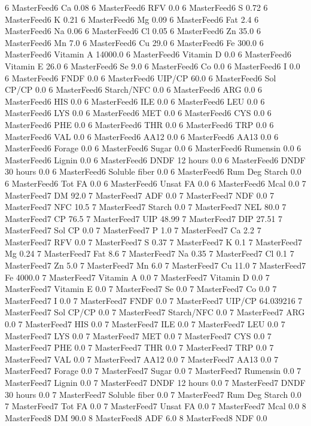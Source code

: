 \documentclass[letterpaper,10pt,english]{sphinxmanual}
\begin{document}
\begin{sphinxVerbatim}[commandchars=\\\{\},numbers=left,firstnumber=1,stepnumber=1]
6 MasterFeed6 Ca 0.08
6 MasterFeed6 RFV 0.0
6 MasterFeed6 S 0.72
6 MasterFeed6 K 0.21
6 MasterFeed6 Mg 0.09
6 MasterFeed6 Fat 2.4
6 MasterFeed6 Na 0.06
6 MasterFeed6 Cl 0.05
6 MasterFeed6 Zn 35.0
6 MasterFeed6 Mn 7.0
6 MasterFeed6 Cu 29.0
6 MasterFeed6 Fe 300.0
6 MasterFeed6 Vitamin A 14000.0
6 MasterFeed6 Vitamin D 0.0
6 MasterFeed6 Vitamin E 26.0
6 MasterFeed6 Se 9.0
6 MasterFeed6 Co 0.0
6 MasterFeed6 I 0.0
6 MasterFeed6 FNDF 0.0
6 MasterFeed6 UIP/CP 60.0
6 MasterFeed6 Sol CP/CP 0.0
6 MasterFeed6 Starch/NFC 0.0
6 MasterFeed6 ARG 0.0
6 MasterFeed6 HIS 0.0
6 MasterFeed6 ILE 0.0
6 MasterFeed6 LEU 0.0
6 MasterFeed6 LYS 0.0
6 MasterFeed6 MET 0.0
6 MasterFeed6 CYS 0.0
6 MasterFeed6 PHE 0.0
6 MasterFeed6 THR 0.0
6 MasterFeed6 TRP 0.0
6 MasterFeed6 VAL 0.0
6 MasterFeed6 AA\PYGZsh{}12 0.0
6 MasterFeed6 AA\PYGZsh{}13 0.0
6 MasterFeed6 \PYGZpc{} Forage 0.0
6 MasterFeed6 Sugar \PYGZpc{} 0.0
6 MasterFeed6 Rumensin 0.0
6 MasterFeed6 Lignin 0.0
6 MasterFeed6 DNDF 12 hours 0.0
6 MasterFeed6 DNDF 30 hours 0.0
6 MasterFeed6 Soluble fiber 0.0
6 MasterFeed6 Rum Deg Starch 0.0
6 MasterFeed6 Tot FA 0.0
6 MasterFeed6 Unsat FA 0.0
6 MasterFeed6 Mcal 0.0
7 MasterFeed7 DM 92.0
7 MasterFeed7 ADF 0.0
7 MasterFeed7 NDF 0.0
7 MasterFeed7 NFC 10.5
7 MasterFeed7 Starch 0.0
7 MasterFeed7 NEL 80.0
7 MasterFeed7 CP 76.5
7 MasterFeed7 UIP 48.99
7 MasterFeed7 DIP 27.51
7 MasterFeed7 Sol CP 0.0
7 MasterFeed7 P 1.0
7 MasterFeed7 Ca 2.2
7 MasterFeed7 RFV 0.0
7 MasterFeed7 S 0.37
7 MasterFeed7 K 0.1
7 MasterFeed7 Mg 0.24
7 MasterFeed7 Fat 8.6
7 MasterFeed7 Na 0.35
7 MasterFeed7 Cl 0.1
7 MasterFeed7 Zn 5.0
7 MasterFeed7 Mn 6.0
7 MasterFeed7 Cu 11.0
7 MasterFeed7 Fe 4000.0
7 MasterFeed7 Vitamin A 0.0
7 MasterFeed7 Vitamin D 0.0
7 MasterFeed7 Vitamin E 0.0
7 MasterFeed7 Se 0.0
7 MasterFeed7 Co 0.0
7 MasterFeed7 I 0.0
7 MasterFeed7 FNDF 0.0
7 MasterFeed7 UIP/CP 64.039216
7 MasterFeed7 Sol CP/CP 0.0
7 MasterFeed7 Starch/NFC 0.0
7 MasterFeed7 ARG 0.0
7 MasterFeed7 HIS 0.0
7 MasterFeed7 ILE 0.0
7 MasterFeed7 LEU 0.0
7 MasterFeed7 LYS 0.0
7 MasterFeed7 MET 0.0
7 MasterFeed7 CYS 0.0
7 MasterFeed7 PHE 0.0
7 MasterFeed7 THR 0.0
7 MasterFeed7 TRP 0.0
7 MasterFeed7 VAL 0.0
7 MasterFeed7 AA\PYGZsh{}12 0.0
7 MasterFeed7 AA\PYGZsh{}13 0.0
7 MasterFeed7 \PYGZpc{} Forage 0.0
7 MasterFeed7 Sugar \PYGZpc{} 0.0
7 MasterFeed7 Rumensin 0.0
7 MasterFeed7 Lignin 0.0
7 MasterFeed7 DNDF 12 hours 0.0
7 MasterFeed7 DNDF 30 hours 0.0
7 MasterFeed7 Soluble fiber 0.0
7 MasterFeed7 Rum Deg Starch 0.0
7 MasterFeed7 Tot FA 0.0
7 MasterFeed7 Unsat FA 0.0
7 MasterFeed7 Mcal 0.0
8 MasterFeed8 DM 90.0
8 MasterFeed8 ADF 6.0
8 MasterFeed8 NDF 0.0

\end{sphinxVerbatim}
\end{document}
